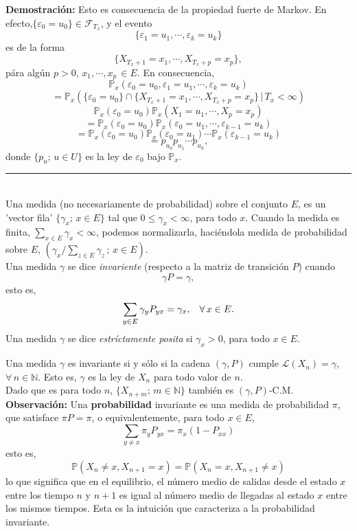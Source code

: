 \documentclass[a4paper]{article}
\newcommand{\prob}{\mathbb{P}}
\numberwithin{equation}{subsection}
\def\N{\mathbb N}
\begin{document}
\textbf{Demostración: }Esto es consecuencia de la propiedad fuerte de Markov. En efecto,\newline $\{\varepsilon_0 = u_0\}\in \mathcal{F}_{T_x}$, y el evento
\[\{\varepsilon_1 = u_1,\cdots,\varepsilon_k = u_k\}\]
es de la forma
\[\{X_{T_x+1}=x_1,\cdots,X_{T_x+p}=x_p\},\]
pára algún $p>0$, $x_1,\cdots,x_p\,\in E$. En consecuencia,
\[\prob_x\left(\varepsilon_0 = u_0,\varepsilon_1 = u_1,\cdots, \varepsilon_k = u_k\right)\]
\[= \prob_x\left(\{\varepsilon_0 = u_0\}\cap\{X_{T_x+1}=x_1,\cdots,X_{T_x +p}=x_p\}\,|\,T_x <\infty\right)\]
\[\prob_x\left(\varepsilon_0 =u_0\right)\prob_x\left(X_1=u_1,\cdots,X_p =x_p\right)\]
\[=\prob_x\left(\varepsilon_0=u_0\right)\prob_x\left(\varepsilon_0=u_1,\cdots,\varepsilon_{k-1}=u_k\right)\]
\[=\prob_x\left(\varepsilon_0 =u_0\right)\prob_x\left(\varepsilon_0=u_1\right)\cdots\prob_x\left(\varepsilon_{k-1}=u_k\right)\]
\[=p_{u_0}p_{u_1}\cdots p_{u_k},\]
donde $\{p_u;\,u\in U\}$ es la ley de $\varepsilon_0$ bajo $\prob_x$.\\
\rule{0.7em}{0.7em}\\ \newline
Una medida (no necesariamente de probabilidad) sobre el conjunto $E$, es un 'vector fila' $\{\gamma_x;\,x\in E\}$ tal que $0\leq \gamma_x < \infty$, para todo $x$. Cuando la medida es finita, $\sum_{x\in E}\gamma_x <\infty$, podemos normalizarla, haciéndola medida de probabilidad sobre $E$, $\left(\gamma_x / \sum_{z\in E}\gamma_z\, ;\,x\in E\right)$.\\ Una medida $\gamma$ se dice \textit{invariente} (respecto a la matriz de transición $P$) cuando
\[\gamma P = \gamma,\]
esto es, 
\[\sum_{y\in E}\gamma_y P_{yx} = \gamma_x,\hspace{0.3cm}\forall\,x\in E.\]
Una medida $\gamma$ se dice \textit{estríctamente posita} si $\gamma_x >0$, para todo $x\in E$.\\ \newline

Una medida $\gamma$ es invariante si y sólo si  la cadena $(\gamma,P)$ cumple $\mathcal{L}(X_n)=\gamma$, $\forall\,n\in \N$. Esto es, $\gamma$ es la ley de $X_n$ para todo valor de $n$.\\ Dado que es para todo $n$, $\{X_{n+m};\,m\in\N\}$ también es $(\gamma,P)$-C.M.\\ \newline
\textbf{Observación: }Una \textbf{probabilidad} invariante es una medida de probabilidad  $\pi$, que satisface $\pi P = \pi$, o equivalentemente, para todo $x\in E$,
\[\sum_{y\neq x}\pi_y P_{yx} = \pi_x\left(1- P_{xx}\right)\]
esto es,
\[\prob\left(X_n\neq x ,X_{n+1}=x\right) = \prob\left(X_n = x,X_{n+1}\neq x\right)\]
lo que significa que en el equilibrio, el número medio de salidas  desde el estado $x$ entre los tiempo $n$ y $n+1$ es igual al número medio de llegadas al estado $x$ entre los mismos tiempos. Esta es la intuición que caracteriza a la probabilidad invariante.
\end{document}
